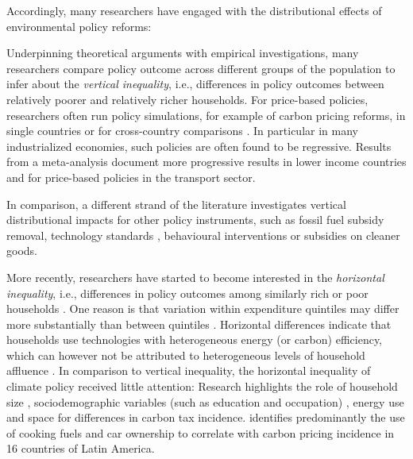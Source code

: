 \documentclass[12pt, a4paper]{article}
\begin{document}
Accordingly, many researchers have engaged with the distributional effects of environmental policy reforms: 

Underpinning theoretical arguments with empirical investigations, many researchers compare policy outcome across different groups of the population to infer about the \textit{vertical inequality}, i.e., differences in policy outcomes between relatively poorer and relatively richer households. For price-based policies, researchers often run policy simulations, for example of carbon pricing reforms, in single countries \autocite{Goulder.2019,Grainger.2010,Rausch.2011,Garaffa.2021,Sterner.2012} or for cross-country comparisons \autocite{Budolfson.2021,Feindt.2021,Dorband.2019,Steckel.2021b}. In particular in many industrialized economies, such policies are often found to be regressive. Results from a meta-analysis \textcite{Ohlendorf.2021} document more progressive results in lower income countries and for price-based policies in the transport sector. 

In comparison, a different strand of the literature investigates vertical distributional impacts for other policy instruments, such as fossil fuel subsidy removal, technology standards \autocite{Levinson.2019,Zhao.2022}, behavioural interventions or subsidies on cleaner goods. 

More recently, researchers have started to become interested in the \textit{horizontal inequality}, i.e., differences in policy outcomes among similarly rich or poor households \autocite{Rausch.2011,Fischer.2019}. One reason is that variation within expenditure quintiles may differ more substantially than between quintiles \autocite{Cronin.2019,Steckel.2021b}. Horizontal differences indicate that households use technologies with heterogeneous energy (or carbon) efficiency, which can however not be attributed to heterogeneous levels of household affluence \autocite{Hansel.2022}. In comparison to vertical inequality, the horizontal inequality of climate policy received little attention: Research highlights the role of household size \autocite{Grainger.2010}, sociodemographic variables (such as education and occupation) \autocite{Buchs.2013,Farrell.2017,Missbach.2023}, energy use \autocite{Steckel.2021b} and space \autocite{Chan.2023} for differences in carbon tax incidence. \textcite{Missbach.2023b} identifies predominantly the use of cooking fuels and car ownership to correlate with carbon pricing incidence in 16 countries of Latin America. 
\end{document}
